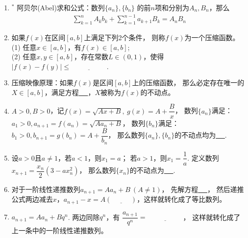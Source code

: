 \documentclass{article}
\newif\ifte
\renewcommand\leq\leqslant
\begin{document}
\begin{multicols}{2}
\begin{enumerate}[leftmargin=20pt]
\item $^*$ 阿贝尔(Abel)求和公式：数列$ \{a_n\},\{b_n\} $
的前$ n $项和分别为$ A_n,B_n $，那么
\begin{gather}
    \sum_{k=1}^{n}A_kb_k+\sum_{k=1}^{n-1}a_{k+1}B_k=A_n B_n 
\end{gather}

\item 如果$ f(x) $在区间$ [a,b] $上满足下列2个条件，
则称$ f(x) $为一个压缩函数。\\
(1) 任意$ x\in [a,b] $，有$ f(x)\in [a,b] $;  \\
(2) 任意$ x,y\in [a,b] $，存在常数$ L\in(0,1) $，使得
$ |f(x)-f(y)|\leq \underline{\ \ifte L|x-y|\else \hspace{2cm} \fi\ } $.

\item 压缩映像原理：如果$ f(x) $是区间$ [a,b] $上的压缩函数，
那么必定存在唯一的$ X\in[a,b] $，满足方程\underline{\ \ifte 
$ X=f(X) $ \else \hspace{2cm} \fi\ }，$ X $被称为$ f(x) $的不动点。

\item $ A>0,B>0 $，记$ f(x)=\sqrt{Ax+B},\ g(x)=A+\dfrac{B}{x} $，
数列$ \{a_n\} $满足：$ a_1>0,a_{n+1}=f(a_n)=\sqrt{Aa_n+B} $，
数列$ \{b_n\} $满足：$ b_1>0,b_{n+1}=g(b_n)=A+\dfrac{B}{b_n} $，
那么数列$ \{a_n\},\{b_n\} $的不动点均为\underline{\ \ifte 
 $ \dfrac{A+\sqrt{A^2+4B}}{2} $ \else \hspace{2cm} \fi\ }. 

\item 设$a>0$且$a\neq 1$，若$a < 1$，则$x_1=a$；
若$a>1$，则$x_1=\dfrac{1}{a}$. 定义数列
$ x_{n+1}=\dfrac{x_n}{2}(3-ax_n^2)$，
那么数列$ \{x_n\} $的不动点为\underline{\ \ifte 
    $ \dfrac{1}{\sqrt{a}} $ \else \hspace{2cm} \fi\ }. 

\item 对于一阶线性递推数列$ a_{n+1}=Aa_{n}+B\ (A\neq 1) $，
先解方程\underline{\ \ifte $ x=Ax+B $\else \hspace{2cm} \fi\ }，
然后递推公式两边减去$ x $，$ a_{n+1}-x=A(\underline{\ \ifte 
a_{n}-x \else \hspace{1cm} \fi\ }) $，这样就转化成了等比数列。

\item $ a_{n+1}=Aa_{n}+Bq^n $. 两边同除$ q^n $，有
$ \dfrac{a_{n+1}}{q^n}=\underline{\ \ifte 
\dfrac{A}{q}\dfrac{a_n}{q^{n-1}}+B\else \hspace{2cm} \fi\ } $，
这样就转化成了上一条中的一阶线性递推数列。


\end{enumerate}
\end{multicols}
\end{document}
